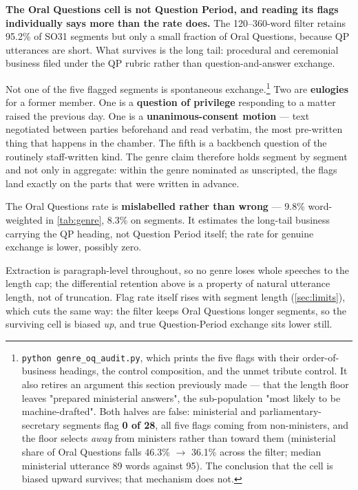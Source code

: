 \textbf{The Oral Questions cell is not Question Period, and reading its flags
individually says more than the rate does.} The 120--360-word filter retains
95.2\% of SO31 segments but only a small fraction of Oral Questions, because
QP utterances are short. What survives is the long tail: procedural and
ceremonial business filed under the QP rubric rather than question-and-answer
exchange.

Not one of the five flagged segments is spontaneous exchange.\footnote{\texttt{python\ genre\_\allowbreak{}oq\_\allowbreak{}audit.\allowbreak{}py}, which prints the five flags with their
  order-of-business headings, the control composition, and the unmet tribute
  control. It also retires an argument this section previously made --- that
  the length floor leaves "prepared ministerial answers", the sub-population
  "most likely to be machine-drafted". Both halves are false: ministerial and
  parliamentary-secretary segments flag \textbf{0 of 28}, all five flags coming
  from non-ministers, and the floor selects \emph{away} from ministers rather than
  toward them (ministerial share of Oral Questions falls 46.3\% \(\rightarrow\) 36.1\% across
  the filter; median ministerial utterance 89 words against 95). The
  conclusion that the cell is biased upward survives; that mechanism does
  not.} Two are
\textbf{eulogies} for a former member. One is a \textbf{question of privilege}
responding to a matter raised the previous day. One is a \textbf{unanimous-consent
motion} --- text negotiated between parties beforehand and read verbatim, the
most pre-written thing that happens in the chamber. The fifth is a backbench
question of the routinely staff-written kind. The genre claim therefore holds
segment by segment and not only in aggregate: within the genre nominated as
unscripted, the flags land exactly on the parts that were written in advance.

The Oral Questions rate is \textbf{mislabelled rather than wrong} --- 9.8\%
word-weighted in \cref{tab:genre}, 8.3\% on segments. It estimates the long-tail business carrying
the QP heading, not Question Period itself; the rate for genuine exchange is
lower, possibly zero.

Extraction is paragraph-level throughout, so no genre loses whole speeches to
the length cap; the differential retention above is a property of natural
utterance length, not of truncation. Flag rate itself rises with segment length
(\cref{sec:limits}), which cuts the same way: the filter keeps Oral Questions\textquotesingle{} longer segments,
so the surviving cell is biased \emph{up}, and true Question-Period exchange sits
lower still.


